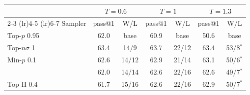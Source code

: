\begin{tabular}{lcccccc}
\toprule
 & \multicolumn{2}{c}{$T{=}0.6$} & \multicolumn{2}{c}{$T{=}1$} & \multicolumn{2}{c}{$T{=}1.3$} \\
\cmidrule(lr){2-3} \cmidrule(lr){4-5} \cmidrule(lr){6-7}
Sampler & pass@1 & W/L & pass@1 & W/L & pass@1 & W/L \\
\midrule
Top-$p$ 0.95 & 62.0 & base & 60.9 & base & 50.6 & base \\
Top-$n\sigma$ 1 & 63.4 & 14/9 & 63.7 & 22/12 & 63.4 & 53/8$^{*}$ \\
Min-$p$ 0.1 & 62.6 & 14/12 & 62.9 & 21/14 & 63.1 & 50/6$^{*}$ \\
\pless{} & 62.0 & 14/14 & 62.6 & 22/16 & 62.6 & 49/7$^{*}$ \\
Top-H 0.4 & 61.7 & 15/16 & 62.6 & 22/16 & 62.9 & 50/7$^{*}$ \\
\bottomrule
\end{tabular}
